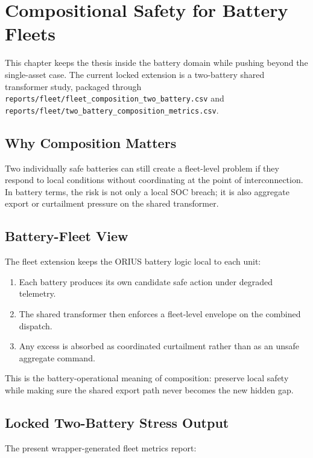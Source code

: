 \chapter{Compositional Safety for Battery Fleets}
\label{ch:compositional-safety-fleets}

This chapter keeps the thesis inside the battery domain while pushing beyond
the single-asset case.  The current locked extension is a two-battery shared
transformer study, packaged through
\texttt{reports/fleet/fleet\_composition\_two\_battery.csv} and
\texttt{reports/fleet/two\_battery\_composition\_metrics.csv}.

\section{Why Composition Matters}

Two individually safe batteries can still create a fleet-level problem if
they respond to local conditions without coordinating at the point of
interconnection.  In battery terms, the risk is not only a local SOC breach;
it is also aggregate export or curtailment pressure on the shared transformer.

\section{Battery-Fleet View}

The fleet extension keeps the ORIUS battery logic local to each unit:

\begin{enumerate}
  \item Each battery produces its own candidate safe action under degraded
    telemetry.
  \item The shared transformer then enforces a fleet-level envelope on the
    combined dispatch.
  \item Any excess is absorbed as coordinated curtailment rather than as an
    unsafe aggregate command.
\end{enumerate}

This is the battery-operational meaning of composition: preserve local safety
while making sure the shared export path never becomes the new hidden gap.

\section{Locked Two-Battery Stress Output}

The present wrapper-generated fleet metrics report:


